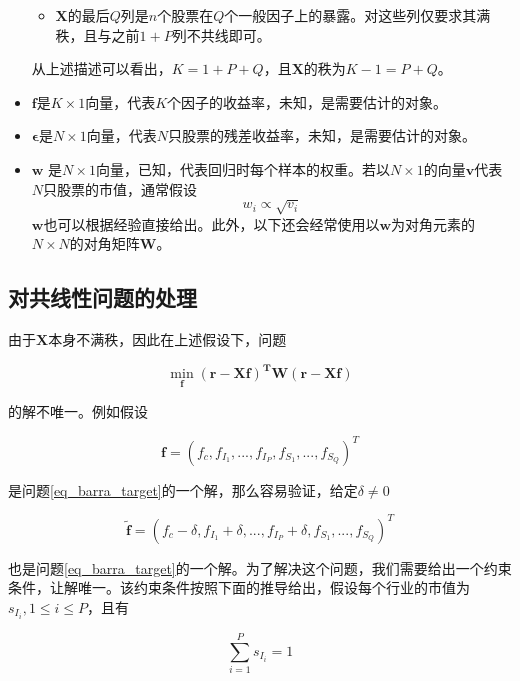\begin{itemize}
\begin{itemize}
              \item $\bm{X}$的最后$Q$列是$n$个股票在$Q$个一般因子上的暴露。对这些列仅要求其满秩，且与之前$1+P$列不共线即可。
          \end{itemize}
          从上述描述可以看出，$K=1+P+Q$，且$\bm{X}$的秩为$K-1=P+Q$。
    \item $\bm{f}$是$K\times 1$向量，代表$K$个因子的收益率，未知，是需要估计的对象。
    \item $\bm{\epsilon}$是$N\times 1$向量，代表$N$只股票的残差收益率，未知，是需要估计的对象。
    \item $\bm{w}$ 是$N\times 1$向量，已知，代表回归时每个样本的权重。若以$N\times 1$的向量$\bm{v}$代表$N$只股票的市值，通常假设
          \begin{equation}
              w_i \propto \sqrt{v_i}
          \end{equation}
          $\bm{w}$也可以根据经验直接给出。此外，以下还会经常使用以$\bm{w}$为对角元素的$N\times N$的对角矩阵$\bm{W}$。
\end{itemize}

\subsection{对共线性问题的处理}

由于$\bm{X}$本身不满秩，因此在上述假设下，问题

\begin{equation}\label{eq_barra_target}
    \min_{\bm{f}} \bm{(r - Xf)^TW(r - Xf)}
\end{equation}

的解不唯一。例如假设

\begin{equation}
    \bm{f}  =  (f_c, f_{I_1},  ..., f_{I_P}, f_{S_1},  ..., f_{S_Q})^T
\end{equation}

是问题\ref{eq_barra_target}的一个解，那么容易验证，给定$\delta \neq 0$

\begin{equation}
    \bm{\tilde{f}}  =  (f_c-\delta, f_{I_1}+\delta,  ..., f_{I_P}+\delta, f_{S_1},  ..., f_{S_Q})^T
\end{equation}

也是问题\ref{eq_barra_target}的一个解。为了解决这个问题，我们需要给出一个约束条件，让解唯一。该约束条件按照下面的推导给出，假设每个行业的市值为$s_{I_i}, 1 \leq  i \leq P$，且有

\begin{equation}
    \sum_{i=1}^Ps_{I_i} = 1
\end{equation}

